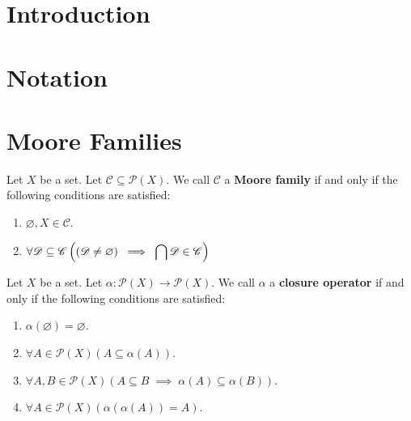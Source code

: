 \documentclass{amsart}
\begin{document}
\maketitle
\begin{abstract}
\end{abstract}

\section{Introduction} %

\section{Notation} %

\section{Moore Families} %
\begin{definition}
Let \(X\) be a set.
Let \(\mathscr{C} \subseteq \mathscr{P} (X)\).
We call \(\mathscr{C}\) a \textbf{Moore family} if and only if
the following conditions are satisfied:
\begin{enumerate}
	\item \(\varnothing , X \in \mathscr{C}\).
	\item \(\forall \mathscr{D} \subseteq \mathscr{C} \left(
	(\mathscr{D} \ne \varnothing) \;\implies\; 
	\displaystyle\bigcap \mathscr{D} \in \mathscr{C}\right)\)
\end{enumerate}
\end{definition}

\begin{definition}
Let \(X\) be a set.
Let \(\alpha : \mathscr{P} (X) \longrightarrow \mathscr{P} (X)\).
We call \(\alpha\) a \textbf{closure operator} if and only if
the following conditions are satisfied:
\begin{enumerate}
	\item \(\alpha (\varnothing) = \varnothing\).
	\item \(\forall A \in \mathscr{P} (X) (A \subseteq \alpha (A))\).
	\item \(\forall A,B \in \mathscr{P} (X) (A \subseteq B \;\implies\; 
	\alpha (A) \subseteq \alpha (B))\).
	\item \(\forall A \in \mathscr{P} (X) (\alpha (\alpha (A)) = A)\).
\end{enumerate}
\end{definition}
\end{document}
